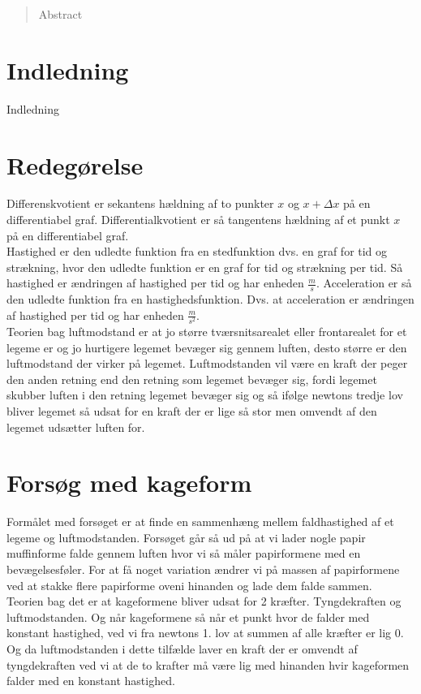 \documentclass[12pt]{article}
\begin{document}
\begin{abstract}
Abstract
\end{abstract}
\pagebreak

\tableofcontents
\pagebreak

\section{Indledning}
Indledning
\section{Redegørelse}
Differenskvotient er sekantens hældning af to punkter $x$ og $x+\Delta x$ på en differentiabel graf.
Differentialkvotient er så tangentens hældning af et punkt $x$ på en differentiabel graf.\\
Hastighed er den udledte funktion fra en stedfunktion dvs. en graf for tid og strækning, hvor den udledte funktion er en graf for tid og strækning per tid. Så hastighed er ændringen af hastighed per tid og har enheden $\frac{m}{s}$.
Acceleration er så den udledte funktion fra en hastighedsfunktion. Dvs. at acceleration er ændringen af hastighed per tid og har enheden $\frac{m}{s^2}$.\\
Teorien bag luftmodstand er at jo større tværsnitsarealet eller frontarealet for et legeme er og jo hurtigere legemet bevæger sig gennem luften, desto større er den luftmodstand der virker på legemet. Luftmodstanden vil være en kraft der peger den anden retning end den retning som legemet bevæger sig,
fordi legemet skubber luften i den retning legemet bevæger sig og så ifølge newtons tredje lov bliver legemet så udsat for en kraft der er lige så stor men omvendt af den legemet udsætter luften for.


\section{Forsøg med kageform}
Formålet med forsøget er at finde en sammenhæng mellem faldhastighed af et legeme og luftmodstanden. Forsøget går så ud på at vi lader nogle papir muffinforme falde gennem luften
hvor vi så måler papirformene med en bevægelsesføler. For at få noget variation ændrer vi på massen af papirformene ved at stakke flere papirforme oveni hinanden og lade dem falde sammen.\\
Teorien bag det er at kageformene bliver udsat for 2 kræfter. Tyngdekraften og luftmodstanden. Og når kageformene så når et punkt hvor de falder med konstant hastighed, ved vi fra newtons 1. lov
at summen af alle kræfter er lig 0. Og da luftmodstanden i dette tilfælde laver en kraft der er omvendt af tyngdekraften ved vi at de to krafter må være lig med hinanden hvir kageformen falder med
en konstant hastighed.
\end{document}

